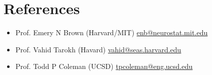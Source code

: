 \section*{References}

\begin{itemize}

    \item Prof. Emery N Brown (Harvard/MIT) \href{mailto:enb@neurostat.mit.edu}{enb@neurostat.mit.edu}


    
    \item Prof. Vahid Tarokh (Havard) \href{mailto:vahid@seas.harvard.edu}{vahid@seas.harvard.edu}


    \item Prof. Todd P Coleman (UCSD) \href{mailto:tpcoleman@eng.ucsd.edu}{tpcoleman@eng.ucsd.edu}
    
    

  \end{itemize}
